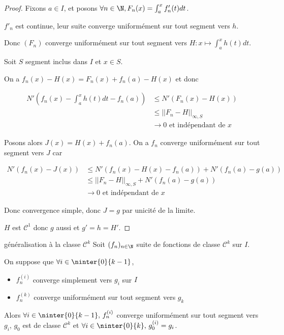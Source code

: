 
\begin{proof}
    Fixons $a \in I$, et posons $\forall n \in \N, F_n(x) = \int_{a}^{x } f_n'(t) dt$.

    $f'_n$ est continue, leur suite converge uniformément sur tout segment vers $h$. 

    Donc $(F_n)$ converge uniformément sur tout segment vers $H : x \mapsto \int_a^x h(t) dt$.

    \avspace Soit $S$ segment inclus dans $I$ et $x \in S$. 
    
    On a 
    $f_n(x) - H(x) = F_n(x) + f_n(a) - H(x)$ et donc 

    \begin{align}
        N'(f_n(x) - \int_{a }^{x } h(t) dt - f_n(a)) & \leqslant N'(F_n(x) - H(x)) \\
        & \leqslant ||F_n - H||_{\infty, S} \\
        & \to 0 \text{ et indépendant de } x
    \end{align}

    Posons alors $J(x) = H(x) + f_n(a)$. On a $f_n$ converge uniformément sur tout segment vers 
    $J$ car  
    
    \begin{align}
        N'(f_n(x) - J(x)) & \leqslant N'(f_n(x) - H(x) - f_n(a)) + N'(f_n(a) - g(a)) \\
        & \leqslant ||F_n - H||_{\infty, S} + N'(f_n(a) - g(a)) \\
        & \to 0 \text{ et indépendant de } x
    \end{align}

    Donc convergence simple, donc $J = g$ par unicité de la limite. 

    $H$ est $\mathscr {C}^1$ donc $g$ aussi et $g' = h = H'$.
\end{proof}

\begin{theoreme}{généralisation à la classe $\mathscr{C}^k$}{}
    Soit $(f_n)_{n \in \N}$ suite de fonctions de classe $\mathscr{C}^k$ sur $I$. 

    On suppose que  $\forall i \in \ninter{0}{k - 1}$, 
    \begin{itemize}
        \item $f_n^{(i)}$ converge simplement vers $g_i$ sur $I$
        \item $f_n^{(k)}$ converge uniformément sur tout segment vers $g_k$
    \end{itemize}

    Alors $\forall i \in \ninter{0}{k - 1}, \, f_n^{(i)}$ converge uniformément sur tout segment vers $g_i$,
    $g_0$ est de classe $\mathscr{C}^k$ et $\forall i \in \ninter{0}{k}, \, g_0^{(i)} = g_i$.
\end{theoreme}

